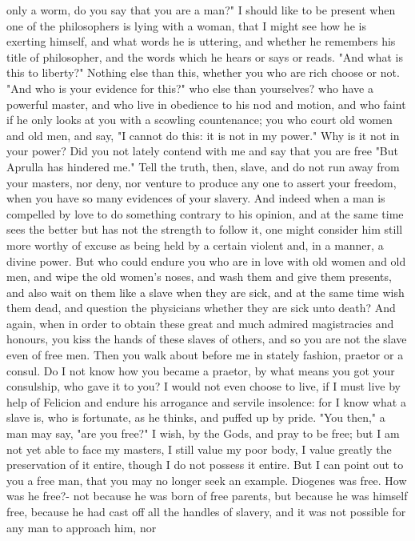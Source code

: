 \documentclass[a4paper]{article}
\begin{document}
only a worm, do you say that you are a man?" I should like to be present when
one of the philosophers is lying with a woman, that I might see how he is
exerting himself, and what words he is uttering, and whether he remembers his
title of philosopher, and the words which he hears or says or reads.
    "And what is this to liberty?" Nothing else than this, whether you who are
rich choose or not. "And who is your evidence for this?" who else than
yourselves? who have a powerful master, and who live in obedience to his nod
and motion, and who faint if he only looks at you with a scowling countenance;
you who court old women and old men, and say, "I cannot do this: it is not in
my power." Why is it not in your power? Did you not lately contend with me and
say that you are free "But Aprulla has hindered me." Tell the truth, then,
slave, and do not run away from your masters, nor deny, nor venture to produce
any one to assert your freedom, when you have so many evidences of your
slavery. And indeed when a man is compelled by love to do something contrary to
his opinion, and at the same time sees the better but has not the strength to
follow it, one might consider him still more worthy of excuse as being held by
a certain violent and, in a manner, a divine power. But who could endure you
who are in love with old women and old men, and wipe the old women's noses, and
wash them and give them presents, and also wait on them like a slave when they
are sick, and at the same time wish them dead, and question the physicians
whether they are sick unto death? And again, when in order to obtain these
great and much admired magistracies and honours, you kiss the hands of these
slaves of others, and so you are not the slave even of free men. Then you walk
about before me in stately fashion, praetor or a consul. Do I not know how you
became a praetor, by what means you got your consulship, who gave it to you? I
would not even choose to live, if I must live by help of Felicion and endure
his arrogance and servile insolence: for I know what a slave is, who is
fortunate, as he thinks, and puffed up by pride.
    "You then," a man may say, "are you free?" I wish, by the Gods, and pray to
be free; but I am not yet able to face my masters, I still value my poor body,
I value greatly the preservation of it entire, though I do not possess it
entire. But I can point out to you a free man, that you may no longer seek an
example. Diogenes was free. How was he free?- not because he was born of free
parents, but because he was himself free, because he had cast off all the
handles of slavery, and it was not possible for any man to approach him, nor
\end{document}
